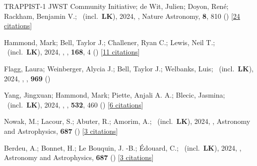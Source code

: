 \item[{\color{numcolor}\scriptsize114}] TRAPPIST-1 JWST Community Initiative; de Wit, Julien; Doyon, Ren{\'e}; Rackham, Benjamin V.; \etal\ (incl.\ \textbf{LK}), 2024, , Nature Astronomy, \textbf{8}, 810 () [\href{https://ui.adsabs.harvard.edu/abs/2024NatAs...8..810T}{24 citations}]

\item[{\color{numcolor}\scriptsize113}] Hammond, Mark; Bell, Taylor J.; Challener, Ryan C.; Lewis, Neil T.; \etal\ (incl.\ \textbf{LK}), 2024, , \aj, \textbf{168}, 4 () [\href{https://ui.adsabs.harvard.edu/abs/2024AJ....168....4H}{11 citations}]

\item[{\color{numcolor}\scriptsize112}] Flagg, Laura; Weinberger, Alycia J.; Bell, Taylor J.; Welbanks, Luis; \etal\ (incl.\ \textbf{LK}), 2024, , \apj, \textbf{969} ()

\item[{\color{numcolor}\scriptsize111}] Yang, Jingxuan; Hammond, Mark; Piette, Anjali A. A.; Blecic, Jasmina; \etal\ (incl.\ \textbf{LK}), 2024, , \mnras, \textbf{532}, 460 () [\href{https://ui.adsabs.harvard.edu/abs/2024MNRAS.532..460Y}{6 citations}]

\item[{\color{numcolor}\scriptsize110}] Nowak, M.; Lacour, S.; Abuter, R.; Amorim, A.; \etal\ (incl.\ \textbf{LK}), 2024, , Astronomy and Astrophysics, \textbf{687} () [\href{https://ui.adsabs.harvard.edu/abs/2024A&A...687A.248N}{3 citations}]

\item[{\color{numcolor}\scriptsize109}] Berdeu, A.; Bonnet, H.; Le Bouquin, J. -B.; {\'E}douard, C.; \etal\ (incl.\ \textbf{LK}), 2024, , Astronomy and Astrophysics, \textbf{687} () [\href{https://ui.adsabs.harvard.edu/abs/2024A&A...687A.157B}{3 citations}]

